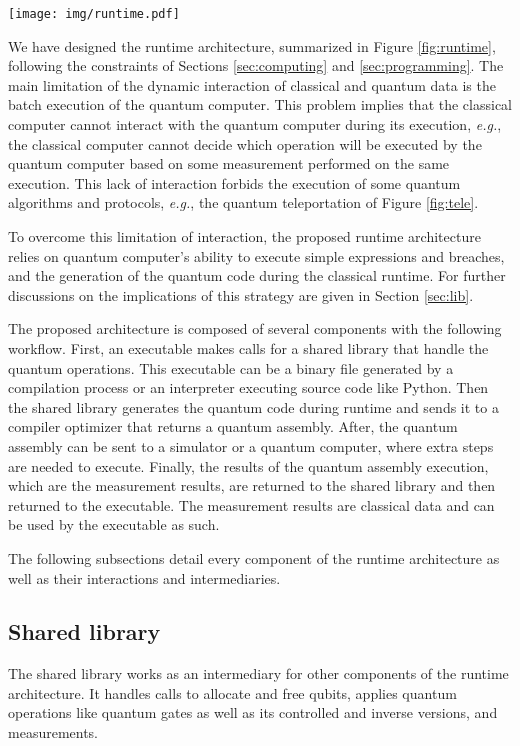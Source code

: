 \documentclass[preprint,3p,times,twocolumn]{elsarticle}
\begin{document}
\begin{figure*}[ht!]
    \centering
    \texttt{[image: img/runtime.pdf]}
    \caption{The proposed runtime architecture for dynamic interaction
    between classical and quantum data.}
    \label{fig:runtime}
\end{figure*}

We have designed the runtime architecture, summarized in Figure
\ref{fig:runtime}, following the constraints of Sections \ref{sec:computing}
and \ref{sec:programming}.  The main limitation of the dynamic interaction of
classical and quantum data is the batch execution of the quantum computer.
This problem implies that the classical computer cannot interact with the
quantum computer during its execution, \textit{e.g.}, the classical computer
cannot decide which operation will be executed by the quantum computer based on
some measurement performed on the same execution. This lack of interaction
forbids the execution of some quantum algorithms and protocols, \textit{e.g.},
the quantum teleportation of Figure \ref{fig:tele}. 

To overcome this limitation of interaction, the proposed runtime architecture
relies on quantum computer's ability to execute simple expressions and
breaches, and the generation of the quantum code during the classical runtime.
For further discussions on the implications of this strategy are given in
Section \ref{sec:lib}.

The proposed architecture is composed of several components with the following
workflow. First, an executable makes calls for a shared library that handle the
quantum operations. This executable can be a binary file generated by a
compilation process or an interpreter executing source code like Python. Then
the shared library generates the quantum code during runtime and sends it to a
compiler optimizer that returns a quantum assembly.  After, the quantum
assembly can be sent to a simulator or a quantum computer, where extra steps
are needed to execute. Finally, the results of the quantum assembly execution,
which are the measurement results, are returned to the shared library and then
returned to the executable. The measurement results are classical data and can
be used by the executable as such. 

The following subsections detail every component of the runtime architecture as
well as their interactions and intermediaries. 

\subsection{Shared library}
The shared library works as an intermediary for other components of the runtime
architecture. It handles calls to allocate and free qubits, applies quantum
operations like quantum gates as well as its controlled and inverse versions,
and measurements. 
\end{document}
